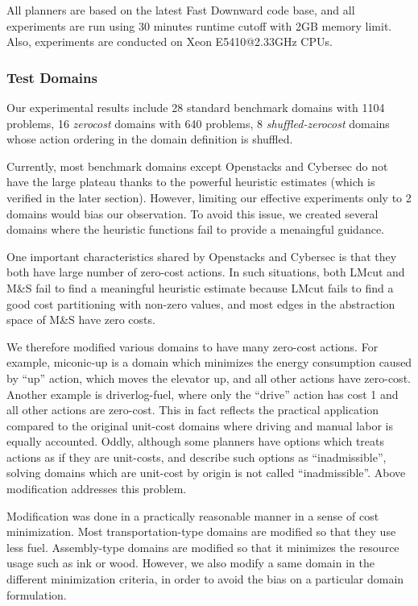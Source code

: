 All planners are based on the latest Fast Downward code base, and all
experiments are run using 30 minutes runtime cutoff with 2GB memory
limit. Also, experiments are conducted on Xeon E5410@2.33GHz CPUs.


\subsubsection{Test Domains}
Our experimental results include 28 standard benchmark domains with
1104 problems, 16 \emph{zerocost} domains with 640 problems, 8 \emph{shuffled-zerocost} 
domains whose action ordering in the domain definition is shuffled.

Currently, most benchmark domains except Openstacks and Cybersec do not
have the large plateau thanks to the powerful heuristic estimates (which
is verified in the later section). However, limiting our effective
experiments only to 2 domains would bias our observation. To avoid this
issue, we created several domains where the \sota heuristic functions
fail to provide a menaingful guidance.

One important characteristics shared by Openstacks and Cybersec is that they both
have large number of zero-cost actions. In such situations, both LMcut
and M\&S fail to find a meaningful heuristic estimate because LMcut fails to
find a good cost partitioning with non-zero values, and most edges in the abstraction space of
M\&S have zero costs.

We therefore modified various domains to have many zero-cost actions.
For example, miconic-up is a domain which minimizes the energy
consumption caused by ``up'' action, which moves the elevator up, and
all other actions have zero-cost. Another example is driverlog-fuel, where only
the ``drive'' action has cost 1 and all other actions are zero-cost.
This in fact reflects the practical application compared to the original
unit-cost domains where driving and manual labor is equally accounted.
Oddly, although some planners have options which treats actions as if
they are unit-costs, and describe such options as ``inadmissible'',
solving domains which are unit-cost by origin is not called
``inadmissible''. Above modification addresses this problem.

Modification was done in a practically reasonable manner in a sense of
cost minimization. Most transportation-type domains are modified so that
they use less fuel. Assembly-type domains are modified so that it
minimizes the resource usage such as ink or wood. However, we also
modify a same domain in the different minimization criteria, in order to
avoid the bias on a particular domain formulation.


